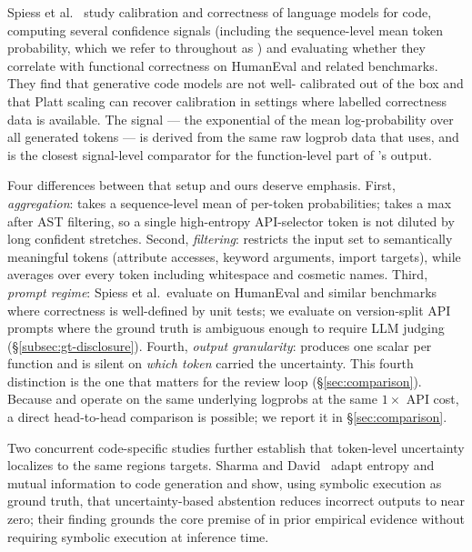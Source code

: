 Spiess et al.~\cite{spiess2025calibration} study calibration and
correctness of language models for code, computing several confidence
signals (including the sequence-level mean token probability, which
we refer to throughout as \papg) and evaluating whether they
correlate with functional correctness on HumanEval and related
benchmarks. They find that generative code models are not well-%
calibrated out of the box and that Platt scaling can recover
calibration in settings where labelled correctness data is available.
The \papg signal --- the exponential of the mean log-probability over
all generated tokens --- is derived from the same raw logprob data
that \eps uses, and is the closest signal-level comparator for the
function-level part of \eps's output.

Four differences between that setup and ours deserve emphasis. First,
\emph{aggregation}: \papg takes a sequence-level mean of per-token
probabilities; \eps takes a max after AST filtering, so a single
high-entropy API-selector token is not diluted by long confident
stretches. Second, \emph{filtering}: \eps restricts the input set to
semantically meaningful tokens (attribute accesses, keyword arguments,
import targets), while \papg averages over every token including
whitespace and cosmetic names. Third, \emph{prompt regime}: Spiess et
al.\ evaluate on HumanEval and similar benchmarks where correctness
is well-defined by unit tests; we evaluate on version-split API
prompts where the ground truth is ambiguous enough to require LLM
judging (\S\ref{subsec:gt-disclosure}). Fourth, \emph{output
granularity}: \papg produces one scalar per function and is silent on
\emph{which token} carried the uncertainty. This fourth distinction
is the one that matters for the review loop (\S\ref{sec:comparison}).
Because \papg and \eps operate on the same underlying logprobs at the
same $1\times$ API cost, a direct head-to-head comparison is
possible; we report it in \S\ref{sec:comparison}.

Two concurrent code-specific studies further establish that token-level
uncertainty localizes to the same regions \eps targets. Sharma and
David~\cite{sharma2025multisample} adapt entropy and mutual information
to code generation and show, using symbolic execution as ground truth,
that uncertainty-based abstention reduces incorrect outputs to near
zero; their finding grounds the core premise of \eps in prior empirical
evidence without requiring symbolic execution at inference time.

